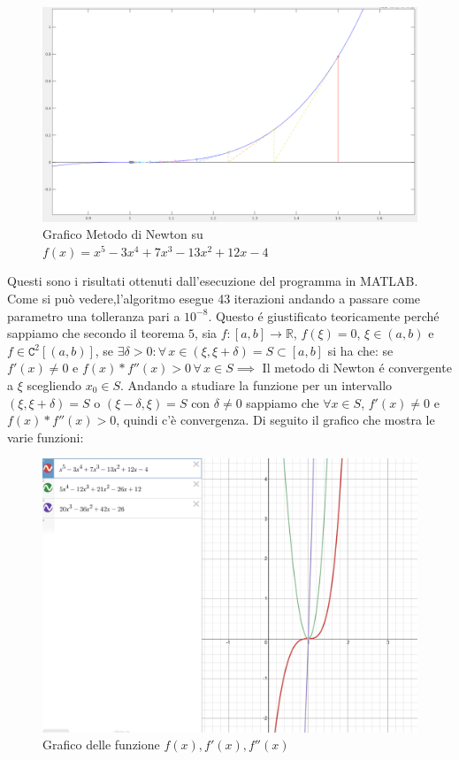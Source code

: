 \documentclass[12pt, letterpaper]{article}
\begin{document}
\begin{figure}[ht!]
    \includegraphics[scale=0.40]{MultiRadixNewton.png}
    \caption{Grafico Metodo di Newton su $f(x)=x^5-3x^4+7x^3-13x^2+12x-4$}
\end{figure}

Questi sono i risultati ottenuti dall'esecuzione del programma in MATLAB.\\ Come si può vedere,l'algoritmo esegue 43 iterazioni andando a passare come parametro una tolleranza pari a $10^{-8}$.
Questo \'e giustificato teoricamente perch\'e sappiamo che secondo il teorema $5$, sia $f:[a,b] \to \mathbb{R}$, $f(\xi)=0$, $\xi \in (a,b)$ e $f \in \mathtt{C}^2[(a,b)]$, se $\exists \delta>0: \forall \, x \in (\xi,\xi+\delta)=S \subset [a,b]$ si ha che:
se  $f'(x) \neq 0 $ e $f(x)*f''(x)>0 \, \forall \, x \in S \implies$ Il metodo di Newton \'e convergente a $\xi$ scegliendo $x_0 \in S$.
Andando a studiare la funzione per un intervallo $(\xi,\xi+\delta)=S$ o $(\xi-\delta,\xi)=S$ con $\delta \neq 0$ sappiamo che $\forall x \in S $, $ f'(x) \neq 0$ e $f(x)*f''(x)>0$, quindi c'è convergenza. Di seguito il grafico che mostra le varie funzioni:
\begin{figure}[ht!]
    \includegraphics[scale=0.38]{MultiRadixGraficoNewton.png}
    \caption{Grafico delle funzione $f(x),f'(x),f''(x)$}
\end{figure}
\end{document}
